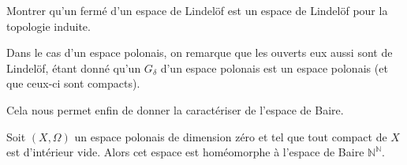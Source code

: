 \begin{exercise}
  Montrer qu'un fermé d'un espace de Lindelöf est un espace de Lindelöf pour la
  topologie induite.
\end{exercise}

\begin{remark}
  Dans le cas d'un espace polonais, on remarque que les ouverts eux aussi sont
  de Lindelöf, étant donné qu'un $G_\delta$ d'un espace polonais est un
  espace polonais (et que ceux-ci sont compacts).
\end{remark}

Cela nous permet enfin de donner la caractériser de l'espace de Baire.

\begin{theorem}
  Soit $(X,\Omega)$ un espace polonais de dimension zéro et tel que tout compact
  de $X$ est d'intérieur vide. Alors cet espace est homéomorphe à l'espace de
  Baire $\mathbb N^\mathbb N$.
\end{theorem}


